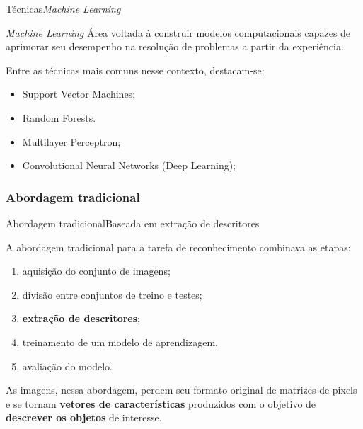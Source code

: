 \documentclass{beamer}
\begin{document}
        \begin{frame}{Técnicas}{\emph{Machine Learning}}
            
            \begin{block}{\emph{Machine Learning}}
                Área voltada à construir modelos computacionais capazes de 
                aprimorar seu desempenho na resolução de problemas a partir da experiência.
            \end{block}

            Entre as técnicas mais comuns nesse contexto, destacam-se:
            \begin{itemize}
                \item Support Vector Machines;
                \item Random Forests.
                \item Multilayer Perceptron;
                \item Convolutional Neural Networks (Deep Learning);
            \end{itemize}
        
        \end{frame}

    \subsubsection{Abordagem tradicional}
    \begin{frame}{Abordagem tradicional}{Baseada em extração de descritores}

        A abordagem tradicional para a tarefa de reconhecimento 
        combinava as etapas:
            \begin{enumerate}
                \item aquisição do conjunto de imagens;
                \item divisão entre conjuntos de treino e testes;
                \item \textbf{extração de descritores};
                \item treinamento de um modelo de aprendizagem.
                \item avaliação do modelo.
            \end{enumerate}

        As imagens, nessa abordagem, perdem seu
        formato original de matrizes de pixels
        e se tornam \textbf{vetores de características}
        produzidos com o objetivo de \textbf{descrever
        os objetos} de interesse.
    \end{frame}
\end{document}
